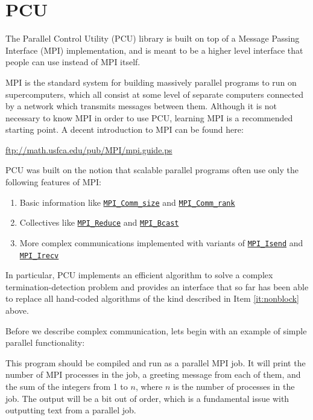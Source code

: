 \documentclass{article}
\begin{document}
\section{PCU}

The Parallel Control Utility (PCU) library is built
on top of a Message Passing Interface (MPI) implementation,
and is meant to be a higher level interface that people
can use instead of MPI itself.

MPI is the standard system for building massively parallel
programs to run on supercomputers, which all consist
at some level of separate computers connected by a
network which transmits messages between them.
Although it is not necessary to know MPI in order to use
PCU, learning MPI is a recommended starting point.
A decent introduction to MPI can be found here:

\url{ftp://math.usfca.edu/pub/MPI/mpi.guide.ps}

PCU was built on the notion that scalable parallel
programs often use only the following features of MPI:

\begin{enumerate}
\item Basic information like
\href{http://www.mpich.org/static/docs/v3.1/www3/MPI_Comm_size.html}{\texttt{MPI\_Comm\_size}}
and
\href{http://www.mpich.org/static/docs/v3.1/www3/MPI_Comm_rank.html}{\texttt{MPI\_Comm\_rank}}
\item Collectives like
\href{http://www.mpich.org/static/docs/v3.1/www3/MPI_Reduce.html}{\texttt{MPI\_Reduce}}
and
\href{http://www.mpich.org/static/docs/v3.1/www3/MPI_Bcast.html}{\texttt{MPI\_Bcast}}
\item \label{it:nonblock} More complex communications implemented with variants of
\href{http://www.mpich.org/static/docs/v3.1/www3/MPI_Isend.html}{\texttt{MPI\_Isend}}
and
\href{http://www.mpich.org/static/docs/v3.1/www3/MPI_Irecv.html}{\texttt{MPI\_Irecv}}
\end{enumerate}

In particular, PCU implements an efficient algorithm to solve a complex
termination-detection problem and provides an interface that
so far has been able to replace all hand-coded algorithms
of the kind described in Item \ref{it:nonblock} above.

Before we describe complex communication, lets begin with an example
of simple parallel functionality:



This program should be compiled and run as a parallel MPI job.
It will print the number of MPI processes in the job, a greeting
message from each of them, and the sum of the integers from 1 to $n$,
where $n$ is the number of processes in the job. 
The output will be a bit out of order, which is a fundamental issue
with outputting text from a parallel job.
\end{document}

